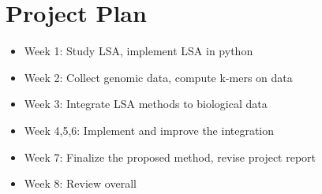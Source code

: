 \documentclass[12pt]{article}
\begin{document}
\section{Project Plan}

\begin{itemize}
	\item Week 1: Study LSA, implement LSA in python
	\item Week 2: Collect genomic data, compute k-mers on data
	\item Week 3: Integrate LSA methods to biological data
	\item Week 4,5,6: Implement and improve the integration
	\item Week 7: Finalize the proposed method, revise project report
	\item Week 8: Review overall
\end{itemize}

\nocite{vrus2017}
\nocite{martin2000speech}
\nocite{landauer1998introduction}
\nocite{dumais2004latent}
 





\end{document}
